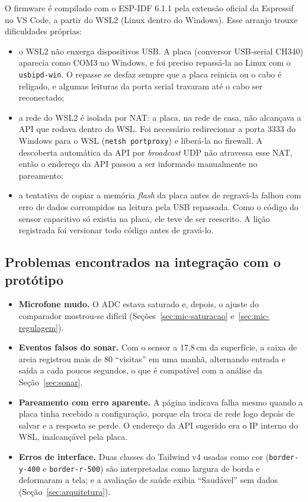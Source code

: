 O firmware é compilado com o ESP-IDF 6.1.1 pela extensão oficial da Espressif no VS Code, a partir do WSL2 (Linux dentro do Windows). Esse arranjo trouxe dificuldades próprias:
\begin{itemize}
  \item o WSL2 não enxerga dispositivos USB. A placa (conversor USB-serial CH340) aparecia como COM3 no Windows, e foi preciso repassá-la ao Linux com o \texttt{usbipd-win}. O repasse se desfaz sempre que a placa reinicia ou o cabo é religado, e algumas leituras da porta serial travaram até o cabo ser reconectado;
  \item a rede do WSL2 é isolada por NAT: a placa, na rede de casa, não alcançava a API que rodava dentro do WSL. Foi necessário redirecionar a porta 3333 do Windows para o WSL (\texttt{netsh portproxy}) e liberá-la no firewall. A descoberta automática da API por \textit{broadcast} UDP não atravessa esse NAT, então o endereço da API passou a ser informado manualmente no pareamento;
  \item a tentativa de copiar a memória \textit{flash} da placa antes de regravá-la falhou com erro de dados corrompidos na leitura pela USB repassada. Como o código do sensor capacitivo só existia na placa, ele teve de ser reescrito. A lição registrada foi versionar todo código antes de gravá-lo.
\end{itemize}

\subsection{Problemas encontrados na integração com o protótipo}

\begin{itemize}
  \item \textbf{Microfone mudo.} O ADC estava saturado e, depois, o ajuste do comparador mostrou-se difícil (Seções~\ref{sec:mic-saturacao} e~\ref{sec:mic-regulagem}).
  \item \textbf{Eventos falsos do sonar.} Com o sensor a 17,8\,cm da superfície, a caixa de areia registrou mais de 80 ``visitas'' em uma manhã, alternando entrada e saída a cada poucos segundos, o que é compatível com a análise da Seção~\ref{sec:sonar}.
  \item \textbf{Pareamento com erro aparente.} A página indicava falha mesmo quando a placa tinha recebido a configuração, porque ela troca de rede logo depois de salvar e a resposta se perde. O endereço da API sugerido era o IP interno do WSL, inalcançável pela placa.
  \item \textbf{Erros de interface.} Duas classes do Tailwind v4 usadas como cor (\texttt{border-y-400} e \texttt{border-r-500}) são interpretadas como largura de borda e deformaram a tela; e a avaliação de saúde exibia ``Saudável'' sem dados (Seção~\ref{sec:arquitetura}).
\end{itemize}
